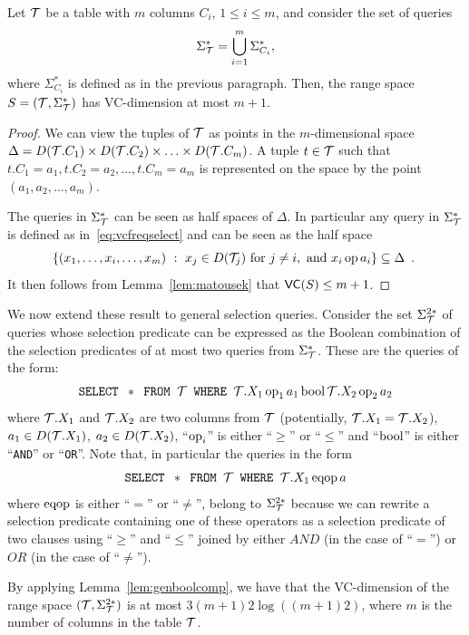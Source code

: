 \begin{lemma}\label{lem:vcdimselmulcol}
  Let ${\cal T}$ be a table with $m$ columns $C_i$, $1\le i\le m$, and consider the
  set of queries 
  \[\Sigma^*_{\cal T}=\bigcup_{i=1}^m \Sigma^*_{C_i},\]
  where
  $\Sigma^*_{C_i}$ is defined as in the previous paragraph. Then, the range
  space $S=({\cal T},\Sigma^*_{\cal T})$ has VC-dimension at most $m+1$.
\end{lemma}

\begin{proof}
  We can view the tuples of ${\cal T}$ as points in the $m$-dimensional space
  $\Delta=D({\cal T}.C_1)\times D({\cal T}.C_2) \times \dotsc\times D({\cal T}.C_m)$. A tuple
  $t\in{\cal T}$ such that $t.C_1=a_1, t.C_2=a_2, \ldots, t.C_m=a_m$ is represented
  on the space by the point $(a_1,a_2,\dotsc,a_m)$.

  The queries in $\Sigma^*_{\cal T}$ can be seen as half spaces of $\Delta$. In
  particular any query in $\Sigma^*_{\cal T}$ is defined as in~\eqref{eq:vcfreqselect}
  and can be seen as the half space 
  \[
  \{(x_1,\dotsc,x_i,\dotsc,x_m) ~:~ x_j\in D({\cal T}_j)\mbox{ for } j\neq i, \mbox{
  and } x_i \operatorname{op} a_i\}\subseteq \Delta\enspace.\
  \]
  It then follows from Lemma~\ref{lem:matousek} that $\mathsf{VC}(S)\le m+1$.
\end{proof}

We now extend these result to general selection queries. Consider the set
$\Sigma^{2*}_{\cal T}$ of queries whose selection predicate can be expressed as the
Boolean combination of the selection predicates of at most two queries from
$\Sigma^*_{\cal T}$. These are the queries of the form:
\[
\mbox{\texttt{SELECT }} * \mbox{\texttt{ FROM }} {\cal T} \mbox{\texttt{ WHERE }}
{\cal T}.X_1 \operatorname{op}_1 a_1 \operatorname{bool} {\cal T}.X_2 \operatorname{op}_2 a_2
\]
where ${\cal T}.X_1$ and ${\cal T}.X_2$ are two columns from ${\cal T}$ (potentially,
${\cal T}.X_1={\cal T}.X_2$), $a_1\in D({\cal T}.X_1)$, $a_2\in D({\cal T}.X_2)$, ``$\operatorname{op}_i$'' is
either ``$\ge$'' or ``$\le$'' and ``$\operatorname{bool}$'' is either ``\texttt{AND}'' or
``\texttt{OR}''. Note that, in particular the queries in the form
\[
\mbox{\texttt{SELECT }} * \mbox{\texttt{ FROM }} {\cal T} \mbox{\texttt{ WHERE }} {\cal T}.X_1 \operatorname{eqop} a
\]
where $\operatorname{eqop}$ is either ``$=$'' or ``$\neq$'', belong to $\Sigma^{2*}_{\cal T}$
because we can rewrite a selection predicate containing one of these operators as
a selection predicate of two clauses using ``$\ge$'' and ``$\le$'' joined by
either $AND$ (in the case of ``$=$'') or $OR$ (in the case of ``$\neq$'').

By applying Lemma~\ref{lem:genboolcomp}, we have that the VC-dimension of the
range space $({\cal T},\Sigma^{2*}_{\cal T})$ is at most $3(m+1)2\log((m+1)2)$, where
$m$ is the number of columns in the table ${\cal T}$.

